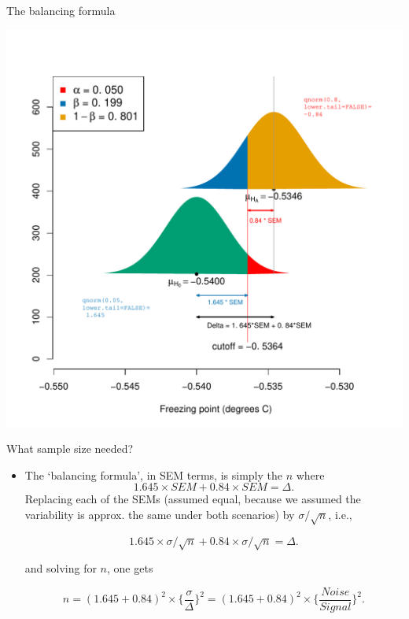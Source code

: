 \documentclass[10pt,handout]{beamer}\usepackage[]{graphicx}\usepackage[]{color}
\makeatletter
\def\maxwidth{ %
  \ifdim\Gin@nat@width>\linewidth
    \linewidth
  \else
    \Gin@nat@width
  \fi
}
\newenvironment{knitrout}{}{} %
\makeatother
\begin{document}
\begin{frame}[fragile]{The balancing formula}
\begin{knitrout}\tiny
{}\color{fgcolor}

{\centering \includegraphics[width=\maxwidth]{figure/unnamed-chunk-15-1} 

}


\end{knitrout}
\end{frame}


\begin{frame}{What sample size needed?}
	
	\begin{itemize}
		\setlength\itemsep{1em}
		\item The `balancing formula', in SEM terms, is simply the $n$ where
		$$ 1.645 \times SEM + 0.84 \times SEM = \Delta.$$
		Replacing each of the  SEMs (assumed equal, because we assumed the variability
		is approx. the same under both scenarios) by $\sigma/\sqrt{n}$,  i.e.,
		
		$$ 1.645 \times \sigma/\sqrt{n} + 0.84 \times \sigma/\sqrt{n} = \Delta.$$
		
		and solving for $n$, one gets
		
		$$  n = (1.645 + 0.84)^2  \times \bigg\{ \frac{\sigma}{\Delta} \bigg\}^2 = 
		(1.645 + 0.84)^2  \times \bigg\{ \frac{Noise}{Signal} \bigg\}^2 .$$
	\end{itemize}
	
\end{frame}
\end{document}

